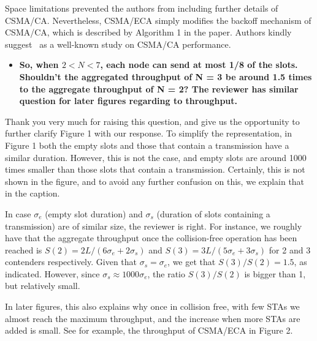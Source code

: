 \documentclass[]{article}
\begin{document}
		Space limitations prevented the authors from including further details of CSMA/CA. Nevertheless, CSMA/ECA simply modifies the backoff mechanism of CSMA/CA, which is described by Algorithm 1 in the paper. Authors kindly suggest~\cite{bianchi2000performance} as a well-known study on CSMA/CA performance.
		
		\begin{itemize}
			\item {\bfseries So, when $2 < N < 7$, each node can send at most 1/8 of the slots. Shouldn't the aggregated throughput of N = 3 be around 1.5 times to the aggregate throughput of N = 2? The reviewer has similar question for later figures regarding to throughput.}
		\end{itemize}
		
		Thank you very much for raising this question, and give us the opportunity to further clarify Figure 1 with our response. To simplify the representation, in Figure 1 both the empty slots and those that contain a transmission have a similar duration. However, this is not the case, and empty slots are around 1000 times smaller than those slots that contain a transmission. Certainly, this is not shown in the figure, and to avoid any further confusion on this, we explain that in the caption.

		In case $\sigma_{e}$ (empty slot duration) and $\sigma_{s}$ (duration of slots containing a transmission) are of similar size, the reviewer is right. For instance, we roughly have that the aggregate throughput once the collision-free operation has been reached is $S(2)= 2L/(6\sigma_{e} + 2\sigma_{s})$ and $S(3)= 3L/(5\sigma_{e} + 3\sigma_{s})$ for 2 and 3 contenders respectively. Given that $\sigma_{s} = \sigma_{e}$, we get that $S(3)/S(2) = 1.5$, as indicated. However, since $\sigma_{s} \approx 1000\sigma_{e}$, the ratio $S(3)/S(2)$ is bigger than 1, but relatively small. 

		In later figures, this also explains why once in collision free, with few STAs we almost reach the maximum throughput, and the increase when more STAs are added is small. See for example, the throughput of CSMA/ECA in Figure 2.
		
\end{document}
